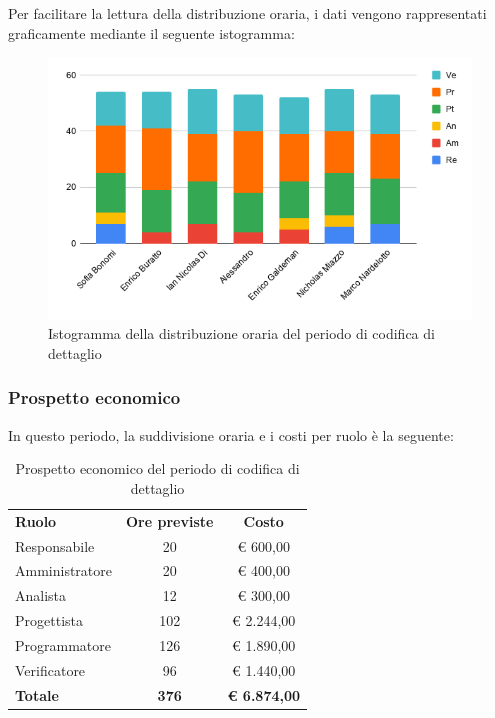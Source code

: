 \documentclass[../piano-di-progetto.tex]{subfiles}
\begin{document}
  Per facilitare la lettura della distribuzione oraria, i dati vengono rappresentati graficamente mediante il seguente istogramma:
  \begin{figure}[H]
    \centering
    \includegraphics[width=12cm]{img/ore-codifica.png}
    \caption{Istogramma della distribuzione oraria del periodo di codifica di dettaglio}
    \label{fig:ore-componente-codifica}
  \end{figure}

  \subsubsection{Prospetto economico}
  In questo periodo, la suddivisione oraria e i costi per ruolo è la seguente:

  \begin{table}[H]
    \centering
    \begin{tabular}{lcc}
      \rowcolor{lightgray}
      \textbf{Ruolo}  & \textbf{Ore previste} & \textbf{Costo}  \\
      Responsabile    & 20           & € 600,00            \\
      Amministratore  & 20           & € 400,00            \\
      Analista        & 12           & € 300,00            \\
      Progettista     & 102          & € 2.244,00          \\
      Programmatore   & 126          & € 1.890,00          \\
      Verificatore    & 96           & € 1.440,00          \\
      \textbf{Totale} & \textbf{376} & \textbf{€ 6.874,00}
    \end{tabular}
    \caption{Prospetto economico del periodo di codifica di dettaglio}
  \end{table}
\end{document}

